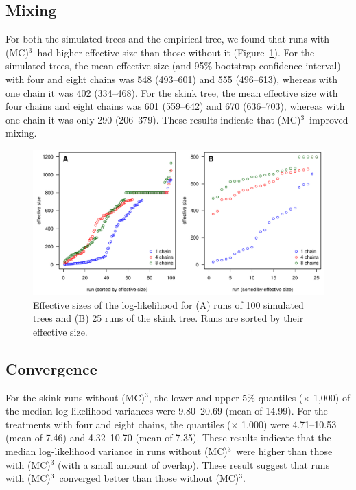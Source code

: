 \documentclass[12pt]{article}
\newcommand{\MCMCMC}{(MC)$^{3}$}
\begin{document}
\subsection*{Mixing}

For both the simulated trees and the empirical tree,
we found that runs with \MCMCMC\ had higher effective size
than those without it (Figure~\ref{fig:eff-size}).
%
For the simulated trees,
the mean effective size (and 95\% bootstrap confidence interval)
with four and eight chains was 548 (493--601) and 555 (496--613),
whereas with one chain it was 402 (334--468).
%
For the skink tree, the mean effective size
with four chains and eight chains was 601 (559--642) and 670 (636--703),
whereas with one chain it was only 290 (206--379).
%
These results indicate that \MCMCMC\ improved mixing.

\begin{figure}
\begin{center}
\includegraphics[width=14cm]{eff-size.pdf}
\end{center}
\caption{Effective sizes of the log-likelihood for
    (A) runs of 100 simulated trees and (B) 25 runs of the skink tree.
    Runs are sorted by their effective size.}
\label{fig:eff-size}
\end{figure}


\subsection*{Convergence}

For the skink runs without \MCMCMC,
the lower and upper 5\% quantiles ($\times$ 1,000)
of the median log-likelihood variances were 9.80--20.69 (mean of 14.99).
%
For the treatments with four and eight chains,
the quantiles ($\times$ 1,000) were 4.71--10.53 (mean of 7.46)
and 4.32--10.70 (mean of 7.35).
%
These results indicate that the median log-likelihood variance
in runs without \MCMCMC\ were higher than those with \MCMCMC
(with a small amount of overlap).
%
These result suggest that runs with \MCMCMC\ 
converged better than those without \MCMCMC.
\end{document}
